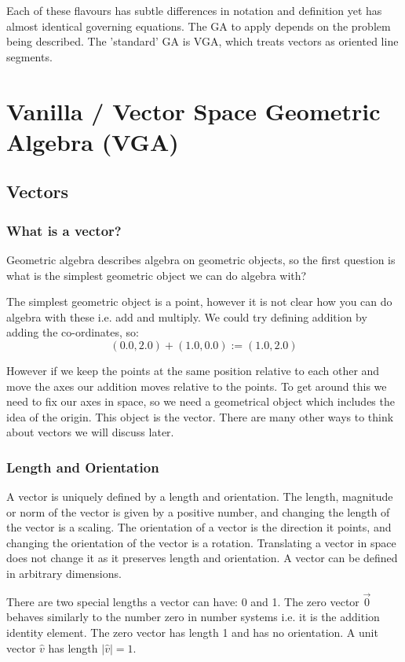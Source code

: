 \documentclass[options]{report}
\begin{document}
Each of these flavours has subtle differences in notation and definition yet has almost identical governing equations. The GA to apply depends on the problem being described. The 'standard' GA is VGA, which treats vectors as oriented line segments.

\chapter{Vanilla / Vector Space Geometric Algebra (VGA)}
\section{Vectors}
\subsection{What is a vector?}
Geometric algebra describes algebra on geometric objects, so the first question is what is the simplest geometric object we can do algebra with?

The simplest geometric object is a point, however it is not clear how you can do algebra with these i.e. add and multiply. We could try defining addition by adding the co-ordinates, so:
\begin{equation}
	(0.0, 2.0) + (1.0, 0.0) := (1.0, 2.0)
\end{equation}

However if we keep the points at the same position relative to each other and move the axes our addition moves relative to the points. To get around this we need to fix our axes in space, so we need a geometrical object which includes the idea of the origin. This object is the vector. There are many other ways to think about vectors we will discuss later.

\subsection{Length and Orientation}
A vector is uniquely defined by a length and orientation. The length, magnitude or norm of the vector is given by a positive number, and changing the length of the vector is a scaling. The orientation of a vector is the direction it points, and changing the orientation of the vector is a rotation. Translating a vector in space does not change it as it preserves length and orientation. A vector can be defined in arbitrary dimensions.

There are two special lengths a vector can have: 0 and 1. The zero vector $\vec{0}$ behaves similarly to the number zero in number systems i.e. it is the addition identity element. The zero vector has length 1 and has no orientation. A unit vector $\hat{v}$ has length $|\hat{v}| = 1$.
\end{document}
